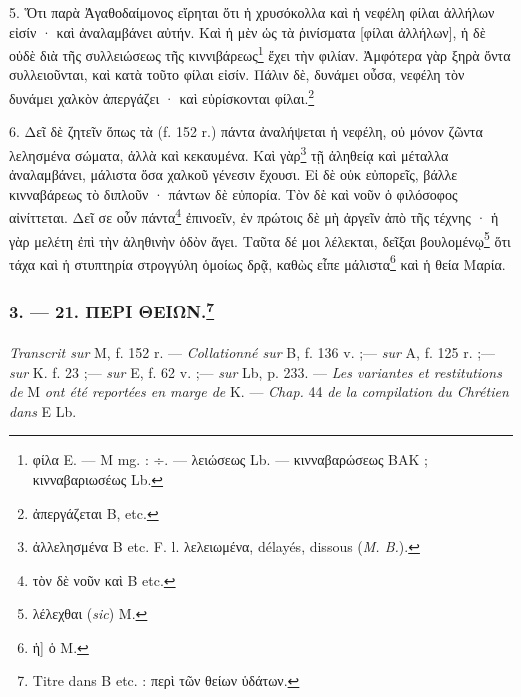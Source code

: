 \documentclass[landscape, a4paper, 11pt, oneside, polutonikogreek, french]{article}
\begin{document}
5. Ὅτι παρὰ Ἀγαθοδαίμονος εἴρηται ὅτι ἡ χρυσόκολλα καὶ ἡ νεφέλη φίλαι ἀλλήλων εἰσίν · καὶ ἀναλαμβάνει αὐτήν. Καὶ ἡ μὲν ὡς τὰ ῥινίσματα [φίλαι ἀλλήλων], ἡ δὲ οὐδὲ διὰ τῆς συλλειώσεως τῆς κιννιβάρεως\footnote{φίλα E. --- M mg. : ÷. --- λειώσεως Lb. --- κινναβαρώσεως BAK ; κινναβαριωσέως Lb.} ἔχει τὴν φιλίαν. Ἀμφότερα γὰρ ξηρὰ ὄντα συλλειοῦνται, καὶ κατὰ τοῦτο φίλαι εἰσίν. Πάλιν δὲ, δυνάμει οὖσα, νεφέλη τὸν δυνάμει χαλκὸν ἀπεργάζει · καὶ εὑρίσκονται φίλαι.\footnote{ἀπεργάζεται B, etc.}

6. Δεῖ δὲ ζητεῖν ὅπως τὰ (f. 152 r.) πάντα ἀναλήψεται ἡ νεφέλη, οὐ μόνον ζῶντα λελησμένα σώματα, ἀλλὰ καὶ κεκαυμένα. Καὶ γὰρ\footnote{ἀλλελησμένα B etc. F. l. λελειωμένα, délayés, dissous (\emph{M. B.}).} τῇ ἀληθείᾳ καὶ μέταλλα ἀναλαμβάνει, μάλιστα ὅσα χαλκοῦ γένεσιν ἔχουσι. Εἰ δὲ οὐκ εὐπορεῖς, βάλλε κινναβάρεως τὸ διπλοῦν · πάντων δὲ εὐπορία. Τὸν δὲ καὶ νοῦν ὁ φιλόσοφος αἰνίττεται. Δεῖ σε οὖν πάντα\footnote{τὸν δὲ νοῦν καὶ B etc.} ἐπινοεῖν, ἐν πρώτοις δὲ μὴ ἀργεῖν ἀπὸ τῆς τέχνης · ἡ γὰρ μελέτη ἐπὶ τὴν ἀληθινὴν ὁδὸν ἄγει. Ταῦτα δέ μοι λέλεκται, δεῖξαι βουλομένῳ\footnote{λέλεχθαι (\emph{sic}) M.} ὅτι τάχα καὶ ἡ στυπτηρία στρογγύλη ὁμοίως δρᾷ, καθὼς εἶπε μάλιστα\footnote{ἡ] ὁ M.} καὶ ἡ θεία Μαρία.

\bigskip
\centerline{\EightStarTaper}
\centerline{\EightStarTaper\EightStarTaper}
\bigskip

\subsubsection[3. --- 21. ΠΕΡΙ ΘΕΙΩΝ.]{3. --- 21. ΠΕΡΙ ΘΕΙΩΝ.\footnote{Titre dans B etc. : περὶ τῶν θείων ὑδάτων.}}
\paragraph{}
\emph{Transcrit sur} M, f. 152 r. --- \emph{Collationné sur} B, f. 136 v. ;--- \emph{sur} A, f. 125 r. ;--- \emph{sur} K. f. 23 ;--- \emph{sur} E, f. 62 v. ;--- \emph{sur} Lb, p. 233. --- \emph{Les variantes et restitutions de} M \emph{ont été reportées en marge de} K. --- \emph{Chap.} 44 \emph{de la compilation du Chrétien dans} E Lb.

\bigskip
\end{document}
